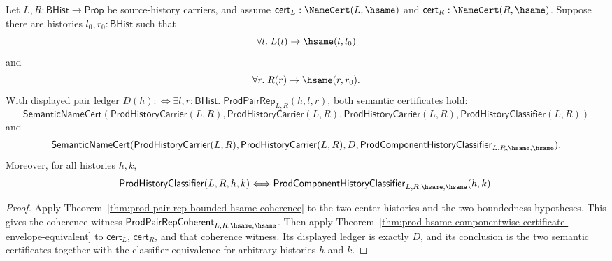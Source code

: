 \begin{theorem}
\label{thm:prod-bounded-hsame-envelope-equivalent}
Let $L,R:\mathsf{BHist}\to\mathsf{Prop}$ be source-history carriers, and
assume $\mathsf{cert}_L:\NameCert(L,\hsame)$ and
$\mathsf{cert}_R:\NameCert(R,\hsame)$. Suppose there are histories
$l_0,r_0:\mathsf{BHist}$ such that
$$
\forall l.\;L(l)\to\hsame(l,l_0)
$$
and
$$
\forall r.\;R(r)\to\hsame(r,r_0).
$$
With displayed pair ledger
$D(h):\Longleftrightarrow
\exists l,r:\mathsf{BHist}.\;\mathsf{ProdPairRep}_{L,R}(h,l,r)$, both
semantic certificates hold:
$$
\mathsf{SemanticNameCert}(\mathsf{ProdHistoryCarrier}(L,R),
\mathsf{ProdHistoryCarrier}(L,R),
\mathsf{ProdHistoryCarrier}(L,R),
\mathsf{ProdHistoryClassifier}(L,R))
$$
and
$$
\mathsf{SemanticNameCert}(\mathsf{ProdHistoryCarrier}(L,R),
\mathsf{ProdHistoryCarrier}(L,R),
D,
\mathsf{ProdComponentHistoryClassifier}_{L,R,\hsame,\hsame}).
$$
Moreover, for all histories $h,k$,
$$
\mathsf{ProdHistoryClassifier}(L,R,h,k)
\Longleftrightarrow
\mathsf{ProdComponentHistoryClassifier}_{L,R,\hsame,\hsame}(h,k).
$$
\end{theorem}
\begin{proof}
Apply Theorem~\ref{thm:prod-pair-rep-bounded-hsame-coherence} to the two
center histories and the two boundedness hypotheses. This gives the coherence
witness $\mathsf{ProdPairRepCoherent}_{L,R,\hsame,\hsame}$. Then apply
Theorem~\ref{thm:prod-hsame-componentwise-certificate-envelope-equivalent} to
$\mathsf{cert}_L$, $\mathsf{cert}_R$, and that coherence witness. Its displayed
ledger is exactly $D$, and its conclusion is the two semantic certificates
together with the classifier equivalence for arbitrary histories $h$ and $k$.
\end{proof}

